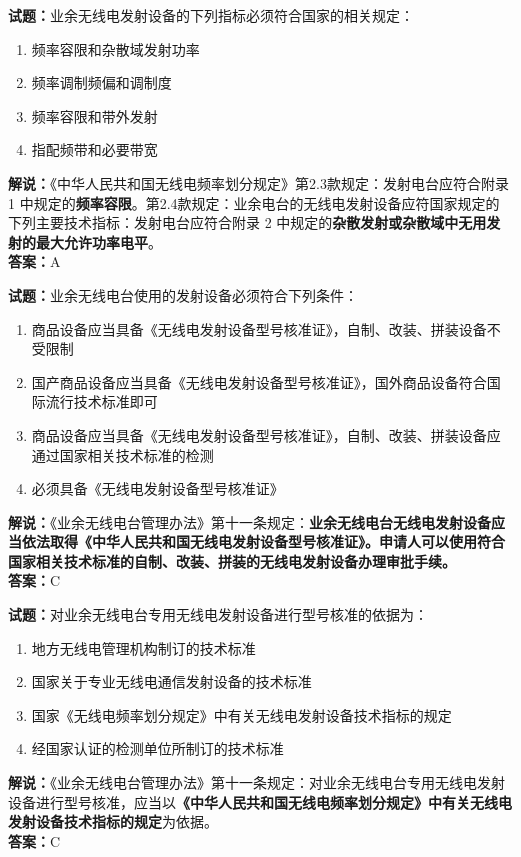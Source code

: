 \documentclass{ctexbook}
\begin{document}
\bigskip


\noindent\textbf{试题：}业余无线电发射设备的下列指标必须符合国家的相关规定：
\begin{enumerate}[leftmargin=3em]
	\item 频率容限和杂散域发射功率
	\item 频率调制频偏和调制度
	\item 频率容限和带外发射
	\item 指配频带和必要带宽
\end{enumerate}
\noindent\textbf{解说：}《中华人民共和国无线电频率划分规定》第2.3款规定：发射电台应符合附录 1 中规定的\textbf{频率容限}。第2.4款规定：业余电台的无线电发射设备应符国家规定的下列主要技术指标：发射电台应符合附录 2 中规定的\textbf{杂散发射或杂散域中无用发射的最大允许功率电平}。\\\noindent\textbf{答案：}A



\bigskip


\noindent\textbf{试题：}业余无线电台使用的发射设备必须符合下列条件：
\begin{enumerate}[leftmargin=3em]
	\item 商品设备应当具备《无线电发射设备型号核准证》，自制、改装、拼装设备不受限制
	\item 国产商品设备应当具备《无线电发射设备型号核准证》，国外商品设备符合国际流行技术标准即可
	\item 商品设备应当具备《无线电发射设备型号核准证》，自制、改装、拼装设备应通过国家相关技术标准的检测
	\item 必须具备《无线电发射设备型号核准证》
\end{enumerate}
\noindent\textbf{解说：}《业余无线电台管理办法》第十一条规定：\textbf{业余无线电台无线电发射设备应当依法取得《中华人民共和国无线电发射设备型号核准证》。申请人可以使用符合国家相关技术标准的自制、改装、拼装的无线电发射设备办理审批手续。}\\\noindent\textbf{答案：}C



\bigskip


\noindent\textbf{试题：}对业余无线电台专用无线电发射设备进行型号核准的依据为：
\begin{enumerate}[leftmargin=3em]
	\item 地方无线电管理机构制订的技术标准
	\item 国家关于专业无线电通信发射设备的技术标准
	\item 国家《无线电频率划分规定》中有关无线电发射设备技术指标的规定
	\item 经国家认证的检测单位所制订的技术标准
\end{enumerate}
\noindent\textbf{解说：}《业余无线电台管理办法》第十一条规定：对业余无线电台专用无线电发射设备进行型号核准，应当以\textbf{《中华人民共和国无线电频率划分规定》中有关无线电发射设备技术指标的规定}为依据。\\\noindent\textbf{答案：}C
\end{document}

